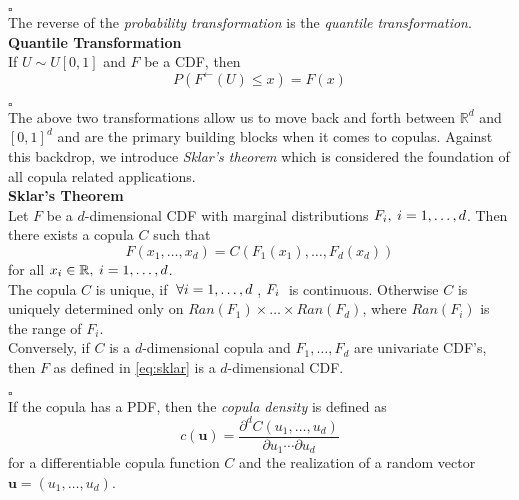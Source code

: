 \hfill $\square$ \\

The reverse of the \textit{probability transformation} is the \textit{quantile transformation}.\\

\textbf{Quantile Transformation}\\
If $U \sim U[0,1]$ and $F$ be a \ac{CDF}, then
\begin{equation}
P\left(F^{\leftarrow}(U) \leq x\right)=F(x)
\label{eq:quantile_transformation}
\end{equation}

\hfill $\square$ \\

The above two transformations allow us to move back and forth between $\mathbb{R}^d$ and $[0,1]^d$ and are the primary building blocks when it comes to copulas. Against this backdrop, we introduce \textit{Sklar's theorem} which is considered the foundation of all copula related applications.\\




\textbf{Sklar's Theorem} \citep{sklar1959fonctions} \\
Let $F$ be a $d$-dimensional \ac{CDF} with marginal distributions $F_{i}, \hspace{0.25em} i = 1, \ldots, d$.
Then there exists a copula $C$ such that
\begin{equation}
F(x_1, \ldots, x_d) = C (F_1(x_1), \ldots, F_d(x_d))
\label{eq:sklar}
\end{equation}
for all $x_i \in \mathbb{R}, \hspace{0.25em} i = 1, \ldots, d $.\\
The copula $C$ is unique, if $ \hspace{0.25em} \forall i = 1, \ldots, d \hspace{0.25em}$,  $F_i \hspace{0.25em}$  is continuous. Otherwise $C$ is uniquely determined only on
$Ran(F_1) \times \ldots \times Ran(F_d)$, where $Ran(F_{i})$ is the range of $F_i$.\\
Conversely, if $C$ is a $d$-dimensional copula and $F_1, \ldots, F_d$ are univariate \ac{CDF}'s, then $F$ as defined in \autoref{eq:sklar} is a 
$d$-dimensional \ac{CDF}.

\hfill $\square$ \\


If the copula has a \ac{PDF}, then the \textit{copula density} is defined as
\begin{equation}
c(\mathbf{u})=\frac{\partial^{d} C\left(u_{1}, \ldots, u_{d}\right)}{\partial u_{1} \cdots \partial u_{d}} 
\label{eq:copula_density_1}
\end{equation}
for a differentiable copula function $C$ and the realization of a random vector $ \bm{u} = (u_1, \ldots, u_d)$.\\

